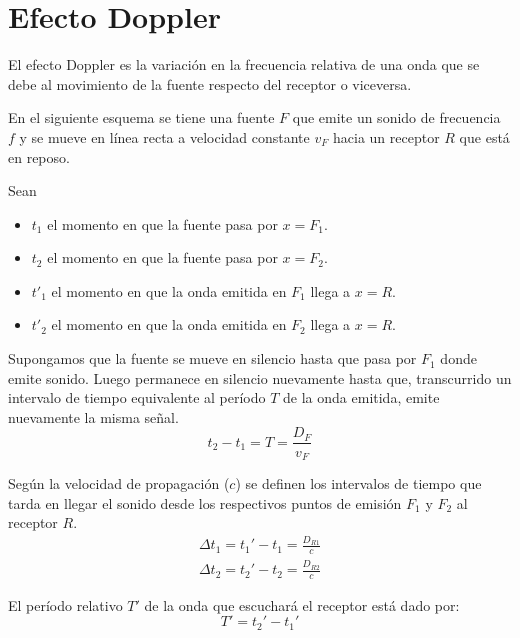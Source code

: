 \documentclass[a5paper,12pt,twoside]{book}
\begin{document}
\section{Efecto Doppler}

El efecto Doppler es la variación en la frecuencia relativa de una onda que se debe al movimiento de la fuente respecto del receptor o viceversa.

En el siguiente esquema se tiene una fuente $F$ que emite un sonido de frecuencia $f$ y se mueve en línea recta a velocidad constante $v_F$ hacia un receptor $R$ que está en reposo.

\begin{center}
    \def\svgwidth{0.8\linewidth}
    
\end{center}

Sean
\begin{itemize}
    \item $t_1$ el momento en que la fuente pasa por $x=F_1$.
    \item $t_2$ el momento en que la fuente pasa por $x=F_2$.
    \item $t'_1$ el momento en que la onda emitida en $F_1$ llega a $x=R$.
    \item $t'_2$ el momento en que la onda emitida en $F_2$ llega a $x=R$.
\end{itemize}

Supongamos que la fuente se mueve en silencio hasta que pasa por $F_1$ donde emite sonido.
Luego permanece en silencio nuevamente hasta que, transcurrido un intervalo de tiempo equivalente al período $T$ de la onda emitida, emite nuevamente la misma señal.
\begin{equation*}
    t_2-t_1 = T = \frac{D_F}{v_F}
\end{equation*}

Según la velocidad de propagación ($c$) se definen los intervalos de tiempo que tarda en llegar el sonido desde los respectivos puntos de emisión $F_1$ y $F_2$ al receptor $R$.
\begin{gather*}
    \Delta t_1 = t_1' - t_1 = \frac{D_{R1}}{c}
    \\
    \Delta t_2 = t_2' - t_2 = \frac{D_{R2}}{c}
\end{gather*}

El período relativo $T'$ de la onda que escuchará el receptor está dado por:
\begin{equation*}
    T' = t_2'-t_1'
\end{equation*}
\end{document}
